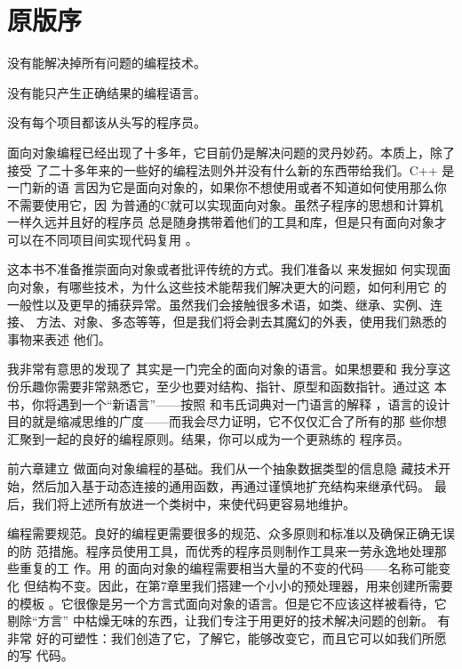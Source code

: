 
\chapter{原版序}

\begin{flushright}
    没有能解决掉所有问题的编程技术。

    没有能只产生正确结果的编程语言。

    没有每个项目都该从头写的程序员。

\end{flushright}

面向对象编程已经出现了十多年，它目前仍是解决问题的灵丹妙药。本质上，除了接受
了二十多年来的一些好的编程法则外并没有什么新的东西带给我们。C++ 是一门新的语
言因为它是面向对象的，如果你不想使用或者不知道如何使用那么你不需要使用它，因
为普通的C就可以实现面向对象。虽然子程序的思想和计算机一样久远并且好的程序员
总是随身携带着他们的工具和库，但是只有面向对象才可以在不同项目间实现代码复用
。

这本书不准备推崇面向对象或者批评传统的方式。我们准备以 来发掘如
何实现面向对象，有哪些技术，为什么这些技术能帮我们解决更大的问题，如何利用它
的一般性以及更早的捕获异常。虽然我们会接触很多术语，如类、继承、实例、连接、
方法、对象、多态等等，但是我们将会剥去其魔幻的外表，使用我们熟悉的事物来表述
他们。

我非常有意思的发现了 其实是一门完全的面向对象的语言。如果想要和
我分享这份乐趣你需要非常熟悉它，至少也要对结构、指针、原型和函数指针。通过这
本书，你将遇到一个“新语言”——按照 和韦氏词典对一门语言的解释
，语言的设计目的就是缩减思维的广度——而我会尽力证明，它不仅仅汇合了所有的那
些你想汇聚到一起的良好的编程原则。结果，你可以成为一个更熟练的
程序员。

前六章建立 做面向对象编程的基础。我们从一个抽象数据类型的信息隐
藏技术开始，然后加入基于动态连接的通用函数，再通过谨慎地扩充结构来继承代码。
最后，我们将上述所有放进一个类树中，来使代码更容易地维护。

编程需要规范。良好的编程更需要很多的规范、众多原则和标准以及确保正确无误的防
范措施。程序员使用工具，而优秀的程序员则制作工具来一劳永逸地处理那些重复的工
作。用 的面向对象的编程需要相当大量的不变的代码——名称可能变化
但结构不变。因此，在第7章里我们搭建一个小小的预处理器，用来创建所需要的模板
。它很像是另一个方言式面向对象的语言。但是它不应该这样被看待，它剔除“方言”
中枯燥无味的东西，让我们专注于用更好的技术解决问题的创新。 有非常
好的可塑性：我们创造了它，了解它，能够改变它，而且它可以如我们所愿的写
 代码。

